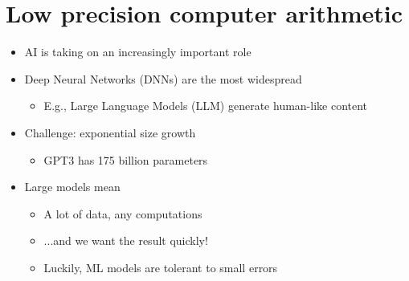 \documentclass[12pt,openany, tikz,border=10pt]{book}
\begin{document}
			      	\section{Low precision computer arithmetic}
			      	
			      	
			      	\begin{itemize}
			      		\item[] AI is taking on an increasingly important role
			      		\item[] Deep Neural Networks (DNNs) are the most widespread
			      		      \begin{itemize}
			      		      	\item[] E.g., Large Language Models (LLM) generate human-like content
			      		      \end{itemize}
			      		\item[] Challenge: exponential size growth
			      		      \begin{itemize}
			      		      	\item[] GPT3 has 175 billion parameters
			      		      \end{itemize}
			      		\item[] Large models mean
			      		      \begin{itemize}
			      		      	\item[] A lot of data, any computations
			      		      	\item[] ...and we want the result quickly!
			      		      	\item[] Luckily, ML models are tolerant to small errors
			      		      \end{itemize}
			      	\end{itemize}
			      	
\end{document}
